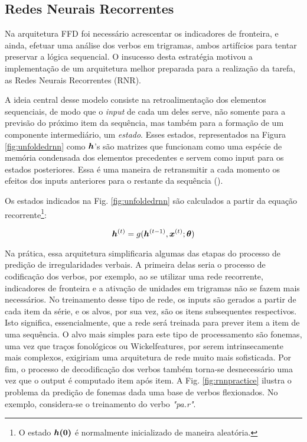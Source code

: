 \subsection{Redes Neurais Recorrentes}
\label{sec:RNN}

Na arquitetura FFD foi necessário acrescentar os indicadores de fronteira, e ainda, efetuar uma análise dos verbos em trigramas, ambos artifícios para tentar preservar a lógica sequencial. O insucesso desta estratégia motivou a implementação de um arquitetura melhor preparada para a realização da tarefa, as Redes Neurais Recorrentes (RNR).

A ideia central desse modelo consiste na retroalimentação dos elementos sequenciais, de modo que o \textit{input} de cada um deles serve, não somente para a previsão do próximo item da sequência, mas também para a formação de um componente intermediário, um \textit{estado}. Esses estados, representados na Figura \ref{fig:unfoldedrnn} como $\bm{h}$'s são matrizes que funcionam como uma espécie de memória condensada dos elementos precedentes e servem como input para os estados posteriores. Essa é uma maneira de retransmitir a cada momento os efeitos dos inputs anteriores para o restante da sequência (\cite{Goodfellow-et-al-2016}). 

%


Os estados indicados na Fig. \ref{fig:unfoldedrnn} são calculados a partir da equação recorrente\footnote{O estado $\bm{h(0)}$ é normalmente inicializado de maneira aleatória.}:

\begin{equation}
\bm{h}^{(t)} = g(\bm{h}^{(t-1)}, \bm{x}^{(t)}; \bm{\theta})
\label{eq:rnn}
\end{equation}

Na prática, essa arquitetura simplificaria algumas das etapas do processo de predição de irregularidades verbais. A primeira delas seria o processo de codificação dos verbos, por exemplo, ao se utilizar uma rede recorrente, indicadores de fronteira e a ativação de unidades em trigramas não se fazem mais necessários. No treinamento desse tipo de rede, os inputs são gerados a partir de cada item da série, e os alvos, por sua vez, são os itens subsequentes respectivos. Isto significa, essencialmente, que a rede será treinada para prever item a item de uma sequência. O alvo mais simples para este tipo de processamento são fonemas, uma vez que traços fonológicos ou Wickelfeatures, por serem intrinsecamente mais complexos, exigiriam uma arquitetura de rede muito mais sofisticada. Por fim, o processo de decodificação dos verbos também torna-se desnecessário uma vez que o output é computado item após item. A Fig. \ref{fig:rnnpractice} ilustra o problema da predição de fonemas dada uma base de verbos flexionados. No exemplo, considera-se o treinamento do verbo \textit{"pa.r\textupsilon"}. 

